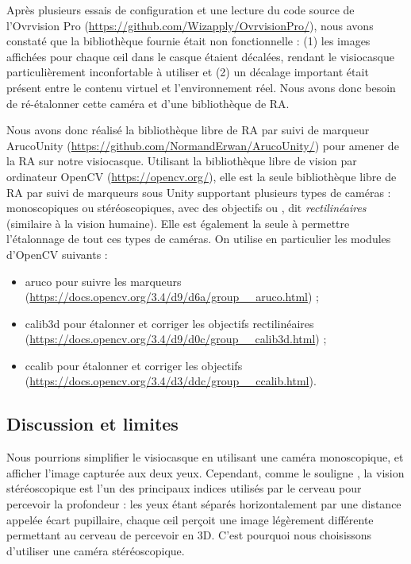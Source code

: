 Après plusieurs essais de configuration et une lecture du code source de l'Ovrvision Pro (\url{https://github.com/Wizapply/OvrvisionPro/}), nous avons constaté que la bibliothèque fournie était non fonctionnelle : (1) les images affichées pour chaque \oe il dans le casque étaient décalées, rendant le visiocasque particulièrement inconfortable à utiliser et (2) un décalage important était présent entre le contenu virtuel et l'environnement réel. Nous avons donc besoin de ré-étalonner cette caméra et d'une bibliothèque de RA.

Nous avons donc réalisé la bibliothèque libre de RA par suivi de marqueur ArucoUnity (\url{https://github.com/NormandErwan/ArucoUnity/}) pour amener de la RA sur notre visiocasque. Utilisant la bibliothèque libre de vision par ordinateur OpenCV (\url{https://opencv.org/}), elle est la seule bibliothèque libre de RA par suivi de marqueurs sous Unity supportant plusieurs types de caméras : monoscopiques ou stéréoscopiques, avec des objectifs  ou , dit \emph{rectilinéaires} (similaire à la vision humaine). Elle est également la seule à permettre l'étalonnage de tout ces types de caméras. On utilise en particulier les modules d'OpenCV suivants :
\begin{itemize}
  \item aruco pour suivre les marqueurs (\url{https://docs.opencv.org/3.4/d9/d6a/group__aruco.html}) ;
  \item calib3d pour étalonner et corriger les objectifs rectilinéaires (\url{https://docs.opencv.org/3.4/d9/d0c/group__calib3d.html}) ;
  \item ccalib pour étalonner et corriger les objectifs  (\url{https://docs.opencv.org/3.4/d3/ddc/group__ccalib.html}).
\end{itemize}


\subsection{Discussion et limites}
\label{subsec:solution_discusion}

Nous pourrions simplifier le visiocasque en utilisant une caméra monoscopique, et afficher l'image capturée aux deux yeux. Cependant, comme le souligne \cite{Bourke1999}, la vision stéréoscopique est l'un des principaux indices utilisés par le cerveau pour percevoir la profondeur : les yeux étant séparés horizontalement par une distance appelée écart pupillaire, chaque \oe il perçoit une image légèrement différente  permettant au cerveau de percevoir en 3D. C'est pourquoi nous choisissons d'utiliser une caméra stéréoscopique.

